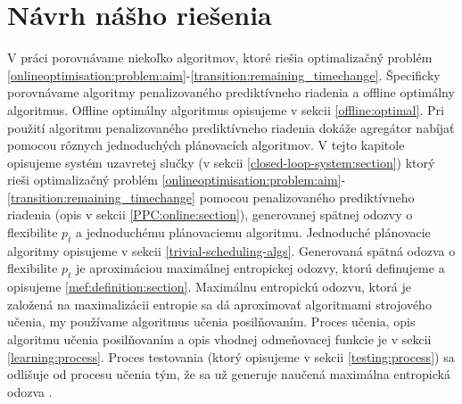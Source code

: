 

% 


\chapter{Návrh nášho riešenia}
\label{chapter:navrhries}

V práci porovnávame niekoľko algoritmov, ktoré riešia optimalizačný problém \eqref{onlineoptimisation:problem:aim}-\eqref{transition:remaining_timechange}. Špecificky porovnávame algoritmy penalizovaného prediktívneho  riadenia a offline optimálny algoritmus. Offline optimálny algoritmus opisujeme v sekcii \ref{offline:optimal}.  Pri použití algoritmu penalizovaného prediktívneho riadenia dokáže agregátor nabíjať pomocou rôznych jednoduchých plánovacích algoritmov. V tejto kapitole opisujeme systém uzavretej slučky (v sekcii \ref{closed-loop-system:section}) ktorý rieši optimalizačný problém \eqref{onlineoptimisation:problem:aim}-\eqref{transition:remaining_timechange} pomocou penalizovaného prediktívneho riadenia (opis v sekcii \ref{PPC:online:section}), generovanej spätnej odozvy o flexibilite $p_{t}$ a jednoduchému plánovaciemu algoritmu. Jednoduché plánovacie algoritmy opisujeme v sekcii \ref{trivial-scheduling-algs}. Generovaná spätná odozva o flexibilite $p_{t}$ je aproximáciou maximálnej entropickej odozvy, ktorú definujeme a opisujeme \ref{mef:definition:section}. Maximálnu entropickú odozvu, ktorá je založená na maximalizácii entropie sa dá aproximovať algoritmami strojového učenia, my používame algoritmus učenia posilňovaním. Proces učenia, opis algoritmu učenia posilňovaním a opis vhodnej odmeňovacej funkcie je v sekcii \ref{learning:process}. Proces testovania (ktorý opisujeme v sekcii \ref{testing:process}) sa odlišuje od procesu učenia tým, že sa už generuje naučená maximálna entropická odozva \cite{Li_2021,Li_information_aggregation}. 




